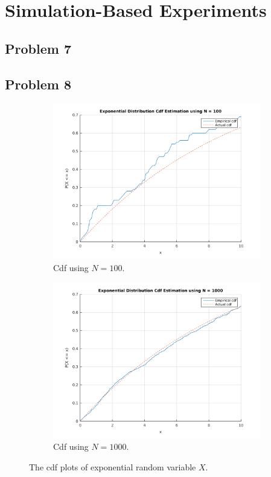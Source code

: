 \documentclass{article}
\begin{document}
\section*{Simulation-Based Experiments}
	\subsection*{Problem 7}
	\subsection*{Problem 8}
		\begin{figure}[!hbt]
			\centering
			\begin{subfigure}[!hbt]{0.45\linewidth}
				\centering
				\includegraphics[width=1\linewidth]{hw2_8_exp_n100.png}
				\caption{Cdf using $N = 100$.}
			\end{subfigure}
			\begin{subfigure}[!hbt]{0.45\linewidth}
				\centering
				\includegraphics[width=1\linewidth]{hw2_8_exp_n1000.png}
				\caption{Cdf using $N = 1000$.}
			\end{subfigure}
			\caption{The cdf plots of exponential random variable $X$.}
		\end{figure}
\end{document}
